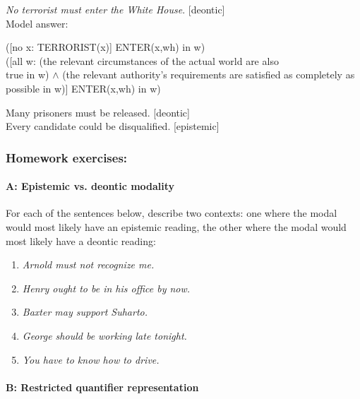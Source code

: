 \ea
\ea \textit{No terrorist must enter the White House}.  [deontic]\\
Model answer:\\
\begin{xlisti} \ex{}   ([no x: TERRORIST(x)] ENTER(x,wh) in w)\\
\ex\relax [no x: TERRORIST(x)] ([all w: (the relevant circumstances of the actual world are also \\
  true in w) $\wedge$ (the relevant authority’s requirements are satisfied as completely as \\
  possible in w)] ENTER(x,wh) in w)
\end{xlisti}
\ex Many prisoners must be released.  [deontic]\\
\ex Every candidate could be disqualified.  [epistemic]
\z
\z
{}

\subsubsection{Homework exercises:}\label{sec:}
\paragraph{A: Epistemic vs. deontic modality}

For each of the sentences below, describe two contexts: one where the modal would most likely have an epistemic reading, the other where the modal would most likely have a deontic reading:

\begin{enumerate}
\item \itshape Arnold must not recognize me.
\item \itshape Henry ought to be in his office by now.
\item \itshape Baxter may support Suharto.
\item \itshape George should be working late tonight.
\item \itshape You have to know how to drive.
\end{enumerate}
\paragraph{B: Restricted quantifier representation}

